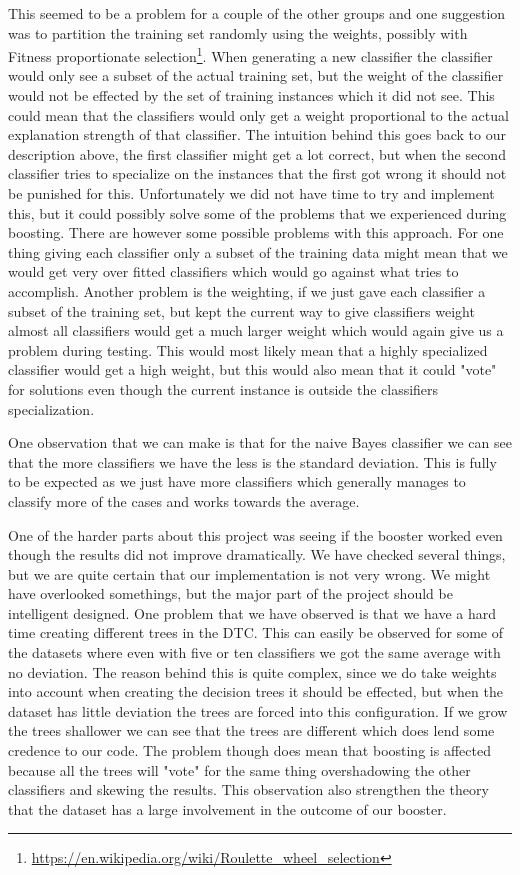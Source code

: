 This
seemed to be a problem for a couple of the other groups and one suggestion was to
partition the training set randomly using the weights, possibly with Fitness
proportionate selection\footnote{\url{
https://en.wikipedia.org/wiki/Roulette_wheel_selection}}. When generating a new
classifier the classifier would only see a subset of the actual training set, but
the weight of the classifier would not be effected by the set of training instances
which it did not see. This could mean that the classifiers would only get a weight
proportional to the actual explanation strength of that classifier. The intuition
behind this goes back to our description above, the first classifier might get a
lot correct, but when the second classifier tries to specialize on the instances
that the first got wrong it should not be punished for this. Unfortunately
we did not have time to try and implement this, but it could possibly solve some
of the problems that we experienced during boosting. There are however some
possible problems with this approach. For one thing giving each classifier only
a subset of the training data might mean that we would get very over fitted
classifiers which would go against what \adaboost{} tries to accomplish. Another
problem is the weighting, if we just gave each classifier a subset of the
training set, but kept the current way to give classifiers weight almost all
classifiers would get a much larger weight which would again give us a problem
during testing. This would most likely mean that a highly specialized classifier
would get a high weight, but this would also mean that it could "vote" for
solutions even though the current instance is outside the classifiers
specialization.

One observation that we can make is that for the naive Bayes classifier we can
see that the more classifiers we have the less is the standard deviation. This
is fully to be expected as we just have more classifiers which generally manages
to classify more of the cases and works towards the average.

One of the harder parts about this project was seeing if the booster worked even
though the results did not improve dramatically. We have checked several things,
but we are quite certain that our implementation is not very wrong. We might
have overlooked somethings, but the major part of the project should be
intelligent designed. One problem that we have observed is that we have a hard
time creating different trees in the DTC. This can easily be observed for some
of the datasets where even with five or ten classifiers we got the same average
with no deviation. The reason behind this is quite complex, since we do take
weights into account when creating the decision trees it should be effected, but
when the dataset has little deviation the trees are forced into this
configuration. If we grow the trees shallower we can see that the trees are
different which does lend some credence to our code. The problem though does
mean that boosting is affected because all the trees will "vote" for the same
thing overshadowing the other classifiers and skewing the results. This
observation also strengthen the theory that the dataset has a large involvement
in the outcome of our booster.


